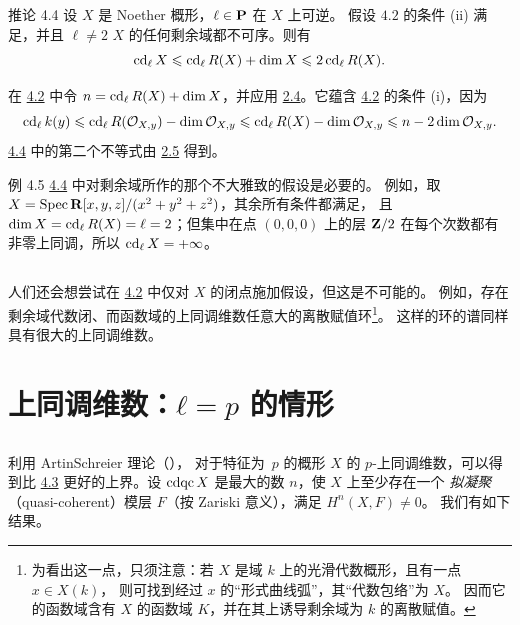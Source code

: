 \begin{enonce*}{推论 4.4}
设 $X$ 是 Noether 概形，$\ell\in \mathbf{P}$ 在 $X$ 上可逆。
假设 $\hyperref[X.cor4.2]{4.2}$ 的条件 {\rm (ii)} 满足，并且
$\ell\neq 2$  $X$ 的任何剩余域都不可序。则有
$$
\operatorname{cd}_{\ell}X\leqslant \operatorname{cd}_{\ell}R(X)+\dim X\leqslant 2\operatorname{cd}_{\ell}R(X){}.
$$
\end{enonce*}

在 \hyperref[X.cor4.2]{4.2} 中令 $n=\operatorname{cd}_{\ell}R(X)+\dim X$，并应用
\hyperref[X.cor2.4]{2.4}。它蕴含 \hyperref[X.cor4.2]{4.2} 的条件 (i)，因为
\[\operatorname{cd}_{\ell}k(y)\leqslant \operatorname{cd}_{\ell}R({\mathcal O}_{X,y})-\dim {\mathcal O}_{X,y}\leqslant
\operatorname{cd}_{\ell}R(X)-\dim{\mathcal O}_{X,y}\leqslant n-2\dim {\mathcal O}_{X,y}.
\]
\hyperref[X.cor4.4]{4.4} 中的第二个不等式由 \hyperref[X.cor2.5]{2.5} 得到。

\begin{enonce*}[remark]{例 4.5}
\hyperref[X.cor4.4]{4.4} 中对剩余域所作的那个不大雅致的假设是必要的。
例如，取 $X=\operatorname{Spec} \mathbf{R}[x,y,z]/(x^2+y^2+z^2)$，其余所有条件都满足，
且 $\dim X=\operatorname{cd}_{\ell}R(X)=\ell=2$；但集中在点 $(0,0,0)$ 上的层 $\mathbf{Z}/2$
在每个次数都有非零上同调，所以 $\operatorname{cd}_{\ell}X=+\infty$。
\end{enonce*}

\setcounter{subsection}{5}
\subsection{}
人们还会想尝试在 \hyperref[X.cor4.2]{4.2} 中仅对 $X$ 的闭点施加假设，但这是不可能的。
例如，存在剩余域代数闭、而函数域的上同调维数任意大的离散赋值环\footnote[1]{
  为看出这一点，只须注意：若 $X$ 是域 $k$ 上的光滑代数概形，且有一点 $x\in X(k)$，
  则可找到经过 $x$ 的“形式曲线弧”，其“代数包络”为 $X$。
  因而它的函数域含有 $X$ 的函数域 $K$，并在其上诱导剩余域为 $k$ 的离散赋值。}。
这样的环的谱同样具有很大的上同调维数。


\section{上同调维数：$ℓ=p$ 的情形}\pageoriginale

\setcounter{subsection}{-1}
\subsection{}
利用 Artin\sisi{ - }{-}Schreier 理论（），
对于特征为~$p$ 的概形 $X$ 的 $p$-上同调维数，可以得到比 \hyperref[X.cor4.3]{4.3}
更好的上界。设 $\operatorname{cdqc} X$ 是最大的数 $n$，使 $X$ 上至少存在一个
\emph{拟凝聚}（quasi-coherent）模层 $F$（按 Zariski 意义），满足 $H^n(X,F)\neq 0$。
我们有如下结果。

